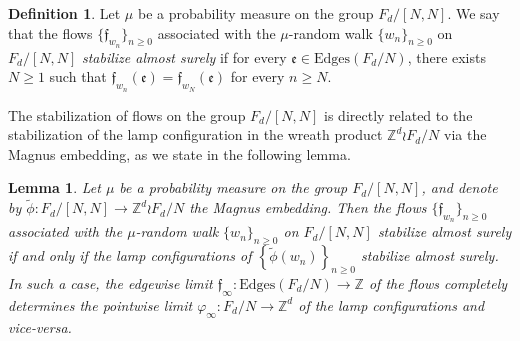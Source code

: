 \documentclass[reqno,oneside,11pt]{amsart}
\newcommand{\Z}{\mathbb{Z}}
\theoremstyle{plain}
\newtheorem{lem}[thm]{Lemma}
\theoremstyle{definition}
\newtheorem{defn}[thm]{Definition} %
\begin{document}
\begin{defn}\label{def: stabilization of flows}
Let $\mu$ be a probability measure on the group $F_d/[N,N]$. We say that the flows $\{\mathfrak{f}_{w_n}\}_{n\ge 0}$ associated with the $\mu$-random walk $\{w_n\}_{n\ge 0}$ on $F_d/[N,N]$ \emph{stabilize almost surely} if for every $\mathfrak{e}\in \mathrm{Edges}(F_d/N)$, there exists $N\ge 1$ such that $\mathfrak{f}_{w_n}(\mathfrak{e})=\mathfrak{f}_{w_N}(\mathfrak{e})$ for every $n\ge N$. 
\end{defn}
The stabilization of flows on the group $F_d/[N,N]$ is directly related to the stabilization of the lamp configuration in the wreath product $\Z^d\wr F_d/N$ via the Magnus embedding, as we state in the following lemma.
\begin{lem}\label{lem: flows stabilize iff lamps stabilize}
Let $\mu$ be a probability measure on the group $F_d/[N,N]$, and denote by $\widetilde{\phi}:F_d/[N,N]\to \Z^d\wr F_d/N$ the Magnus embedding. Then the flows $\{\mathfrak{f}_{w_n}\}_{n\ge 0}$ associated with the $\mu$-random walk $\{w_n\}_{n\ge 0}$ on $F_d/[N,N]$ stabilize almost surely if and only if the lamp configurations of $\left\{\widetilde{\phi}(w_n) \right\}_{n\ge 0}$ stabilize almost surely. In such a case, the edgewise limit $\mathfrak{f}_{\infty}:\mathrm{Edges}(F_d/N)\to \Z$ of the flows completely determines the pointwise limit $\varphi_{\infty}:F_d/N\to \Z^d$ of the lamp configurations and vice-versa.
\end{lem}
\end{document}
